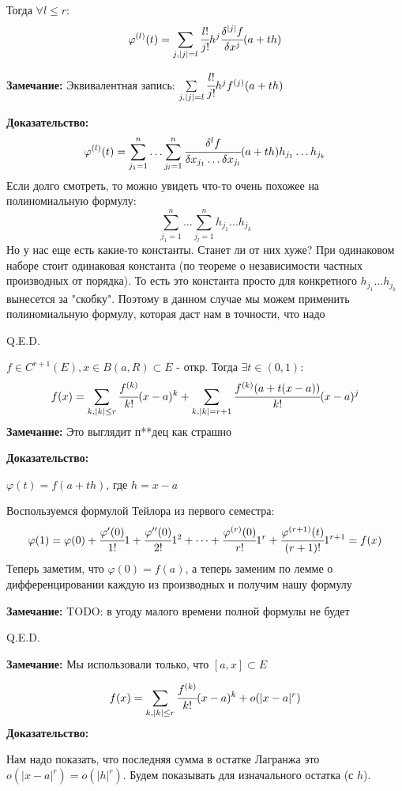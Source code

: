 Тогда $\forall l \leq r:$
$$\varphi^{(l)}(t) = \sum\limits_{j,|j| = l} \cfrac{l!}{j!} h^j \cfrac{\delta^{|j|}f}{\delta x^j}(a+th)$$

\textbf{Замечание:} Эквивалентная запись: $ \sum\limits_{j,|j| = l} \cfrac{l!}{j!} h^j f^{(j)}(a+th)$

\textbf{Доказательство:}
$$\varphi^{(l)}(t) = \sum\limits_{j_1= 1}^n\ldots \sum\limits_{j_l=1}^n 
\cfrac{\delta^lf}{\delta x_{j_1}\ldots \delta x_{j_l}}(a+th)h_{j_1}\ldots h_{j_k}$$
Если долго смотреть, то можно увидеть что-то очень похожее на полиномиальную формулу:
$$\sum\limits_{j_1= 1}^n\ldots \sum\limits_{j_l=1}^n 
h_{j_1}\ldots h_{j_k}$$
Но у нас еще есть какие-то константы. Станет ли от них хуже? При одинаковом наборе стоит одинаковая константа (по теореме о независимости частных производных от порядка). То есть это константа просто для конкретного $h_{j_1}\ldots h_{j_k}$ вынесется за "скобку". Поэтому в данном случае мы можем применить полиномиальную формулу, которая даст нам в точности, что надо

\hfill Q.E.D.


$f \in C^{r+1}(E), x \in B(a,R)\subset E$ - откр. Тогда $\exists t \in (0,1)$:
$$f(x) = \sum\limits_{k, |k| \leq r} \cfrac{f^{(k)}}{k!}(x-a)^k + \sum\limits_{k, |k| = r+1} \cfrac{f^{(k)}(a + t(x-a))}{k!}(x-a)^j$$
\textbf{Замечание:} Это выглядит п**дец как страшно

\textbf{Доказательство:}

$\varphi(t) = f(a+th)$, где $h =x-a$

Воспользуемся формулой Тейлора из первого семестра:
$$\varphi(1) = \varphi(0) + \cfrac{\varphi'(0)}{1!} 1 + \cfrac{\varphi''(0)}{2!} 1^2 + \dots + \cfrac{\varphi^{(r)}(0)}{r!} 1^r + \cfrac{\varphi^{(r+1)}(t)}{(r+1)!} 1^{r+1} = f(x)$$
Теперь заметим, что $\varphi(0) = f(a)$, а теперь заменим по лемме о дифференцировании каждую из производных и получим нашу формулу

\textbf{Замечание:} TODO: в угоду малого времени полной формулы не будет

\hfill Q.E.D.

\textbf{Замечание:} Мы использовали только, что $[a,x] \subset E$

$$f(x) = \sum\limits_{k, |k| \leq r} \cfrac{f^{(k)}}{k!}(x-a)^k + o(|x-a|^r)$$
\textbf{Доказательство:}

Нам надо показать, что последняя сумма в остатке Лагранжа это $o(|x-a|^r)  = o(|h|^r)$. Будем показывать для изначального остатка (с $h$).

